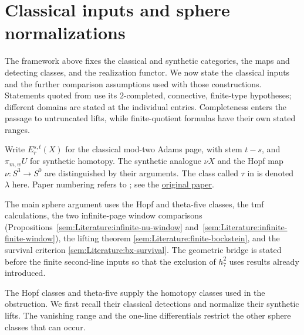\section{Classical inputs and sphere normalizations}

The framework above fixes the classical and synthetic categories, the
maps and detecting classes, and the realization functor. We now state
the classical inputs and the further comparison assumptions used with
those constructions. Statements quoted from \cite{LWX126} use its
$2$-completed, connective, finite-type hypotheses; different domains
are stated at the individual entries. Completeness enters the passage
to untruncated lifts, while finite-quotient formulas have their own
stated ranges.

Write $E_r^{s,t}(X)$ for the classical mod-two Adams page, with stem
$t-s$, and $\pi_{m,w}U$ for synthetic homotopy. The synthetic analogue
$\nu X$ and the Hopf map $\nu:S^3\to S^0$ are distinguished by their
arguments. The class called $\tau$ in \cite{BHS} is denoted $\lambda$
here. Paper numbering refers to \cite{LWX126}; see the
\href{paper/2412.10879.pdf}{original paper}.

The main sphere argument uses the Hopf and theta-five classes, the tmf
calculations, the two infinite-page window comparisons
(Propositions~\ref{sem:Literature:infinite-nu-window}
and~\ref{sem:Literature:infinite-finite-window}), the lifting theorem
\ref{sem:Literature:finite-bockstein}, and the survival criterion
\ref{sem:Literature:bx-survival}. The geometric bridge is stated before
the finite second-line inputs so that the exclusion of $h_7^2$ uses
results already introduced.

The Hopf classes and theta-five supply the homotopy classes used in the
obstruction. We first recall their classical detections and normalize
their synthetic lifts. The vanishing range and the one-line
differentials restrict the other sphere classes that can occur.

